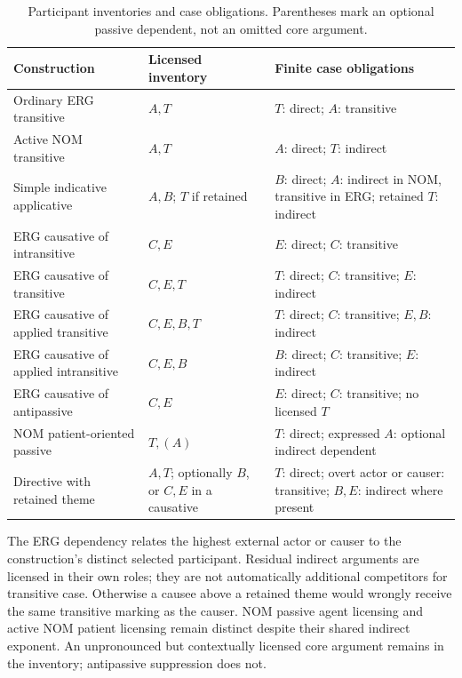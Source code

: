 \begin{table}[htbp]
\footnotesize
\caption{Participant inventories and case obligations. Parentheses mark an
optional passive dependent, not an omitted core argument.}
\label{tab:pivot-case-obligations}
\begin{tabularx}{\textwidth}{L L L}
\toprule
Construction & Licensed inventory & Finite case obligations \\
\midrule
Ordinary ERG transitive & $A,T$ & $T$: direct; $A$: transitive \\
Active NOM transitive & $A,T$ & $A$: direct; $T$: indirect \\
Simple indicative applicative & $A,B$; $T$ if retained & $B$: direct; $A$: indirect in NOM, transitive in ERG; retained $T$: indirect \\
ERG causative of intransitive & $C,E$ & $E$: direct; $C$: transitive \\
ERG causative of transitive & $C,E,T$ & $T$: direct; $C$: transitive; $E$: indirect \\
ERG causative of applied transitive & $C,E,B,T$ & $T$: direct; $C$: transitive; $E,B$: indirect \\
ERG causative of applied intransitive & $C,E,B$ & $B$: direct; $C$: transitive; $E$: indirect \\
ERG causative of antipassive & $C,E$ & $E$: direct; $C$: transitive; no licensed $T$ \\
NOM patient-oriented passive & $T,(A)$ & $T$: direct; expressed $A$: optional indirect dependent \\
Directive with retained theme & $A,T$; optionally $B$, or $C,E$ in a causative & $T$: direct; overt actor or causer: transitive; $B,E$: indirect where present \\
\bottomrule
\end{tabularx}
\end{table}

The ERG dependency relates the highest external actor or causer to the
construction's distinct selected participant. Residual indirect arguments are
licensed in their own roles; they are not automatically additional competitors
for transitive case. Otherwise a causee above a retained theme would wrongly
receive the same transitive marking as the causer. NOM passive agent licensing
and active NOM patient licensing remain distinct despite their shared indirect
exponent. An unpronounced but contextually licensed core argument remains in
the inventory; antipassive suppression does not.

